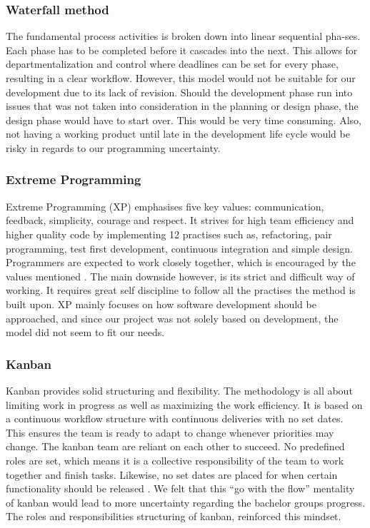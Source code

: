 \subsubsection*{Waterfall method}
The fundamental process activities is broken down into linear sequential pha-ses\cite{WaterfallMethod}. Each phase has to be completed before it cascades into the next. This allows for departmentalization and control where deadlines can be set for every phase, resulting in a clear workflow. However, this model would not be suitable for our development due to its lack of revision. Should the development phase run into issues that was not taken into consideration in the planning or design phase, the design phase would have to start over. This would be very time consuming. Also, not having a working product until late in the development life cycle would be risky in regards to our programming uncertainty.   

\subsubsection*{Extreme Programming}
Extreme Programming (XP) emphasises five key values: communication, feedback, simplicity, courage and respect. It strives for high team efficiency and higher quality code by implementing 12 practises such as, refactoring, pair programming, test first development, continuous integration and simple design. Programmers are expected to work closely together, which is encouraged by the values mentioned \cite{eXtremeP}. The main downside however, is its strict and difficult way of working. It requires great self discipline to follow all the practises the method is built upon. XP mainly focuses on how software development should be approached, and since our project was not solely based on development, the model did not seem to fit our needs.  
\newpage

\subsubsection*{Kanban}
Kanban provides solid structuring and flexibility. The methodology is all about limiting work in progress as well as maximizing the work efficiency. It is based on a continuous workflow structure with continuous deliveries with no set dates. This ensures the team is ready to adapt to change whenever priorities may change. The kanban team are reliant on each other to succeed. No predefined roles are set, which means it is a collective responsibility of the team to work together and finish tasks. Likewise, no set dates are placed for when certain functionality should be released \cite{kanban}. We felt that this ``go with the flow'' mentality of kanban would lead to more uncertainty regarding the bachelor groups progress. The roles and responsibilities structuring of kanban, reinforced this mindset.  

